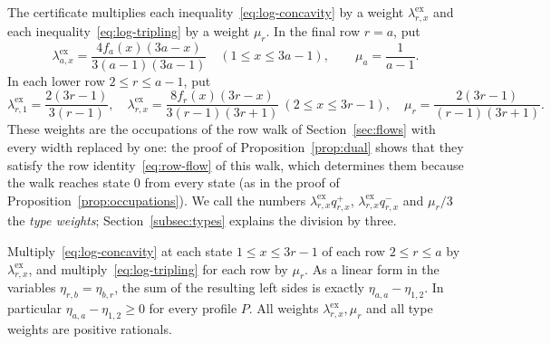The certificate multiplies each inequality~\eqref{eq:log-concavity} by a
weight \(\lambda^{\mathrm{ex}}_{r,x}\) and each
inequality~\eqref{eq:log-tripling} by a weight \(\mu_r\). In the final
row \(r=a\), put
\begin{equation}\label{eq:final-weights}
 \lambda^{\mathrm{ex}}_{a,x}=\frac{4f_a(x)(3a-x)}{3(a-1)(3a-1)}
 \quad(1\le x\le3a-1),\qquad
 \mu_a=\frac1{a-1}.
\end{equation}
In each lower row \(2\le r\le a-1\), put
\begin{equation}\label{eq:lower-weights}
 \lambda^{\mathrm{ex}}_{r,1}=\frac{2(3r-1)}{3(r-1)},\quad
 \lambda^{\mathrm{ex}}_{r,x}=\frac{8f_r(x)(3r-x)}{3(r-1)(3r+1)}
 \ (2\le x\le3r-1),\quad
 \mu_r=\frac{2(3r-1)}{(r-1)(3r+1)}.
\end{equation}
These weights are the occupations of the row walk of
Section~\ref{sec:flows} with every width replaced by one: the proof of
Proposition~\ref{prop:dual} shows that they satisfy the row
identity~\eqref{eq:row-flow} of this walk, which determines them because
the walk reaches state \(0\) from every state (as in the proof of
Proposition~\ref{prop:occupations}). We call the numbers
\(\lambda^{\mathrm{ex}}_{r,x}q^+_{r,x}\),
\(\lambda^{\mathrm{ex}}_{r,x}q^-_{r,x}\) and \(\mu_r/3\) the \emph{type
weights}; Section~\ref{subsec:types} explains the division by three.

\begin{proposition}\label{prop:dual}
Multiply~\eqref{eq:log-concavity} at each state \(1\le x\le3r-1\) of each
row \(2\le r\le a\) by \(\lambda^{\mathrm{ex}}_{r,x}\), and
multiply~\eqref{eq:log-tripling} for each row by \(\mu_r\). As a linear
form in the variables \(\eta_{r,b}=\eta_{b,r}\), the sum of the resulting
left sides is exactly \(\eta_{a,a}-\eta_{1,2}\). In particular
\(\eta_{a,a}-\eta_{1,2}\ge0\) for every profile \(P\). All weights
\(\lambda^{\mathrm{ex}}_{r,x},\mu_r\) and all type weights are positive
rationals.
\end{proposition}

